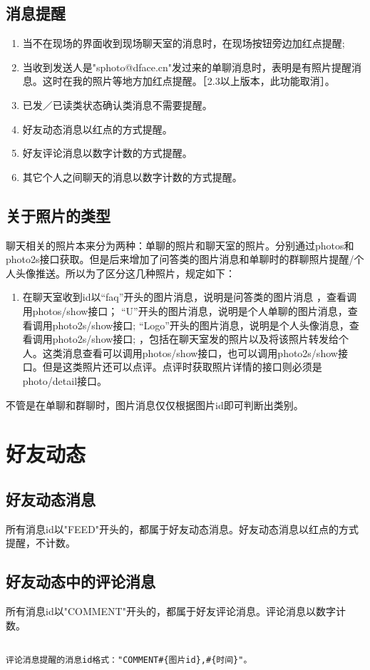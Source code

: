 \subsection{消息提醒}
\begin{enumerate}
\item 当不在现场的界面收到现场聊天室的消息时，在现场按钮旁边加红点提醒;
\item 当收到发送人是"sphoto@dface.cn"发过来的单聊消息时，表明是有照片提醒消息。这时在我的照片等地方加红点提醒。［2.3以上版本，此功能取消］。
\item 已发／已读类状态确认类消息不需要提醒。
\item 好友动态消息以红点的方式提醒。
\item 好友评论消息以数字计数的方式提醒。
\item 其它个人之间聊天的消息以数字计数的方式提醒。
\end{enumerate}


\subsection{关于照片的类型}
聊天相关的照片本来分为两种：单聊的照片和聊天室的照片。分别通过photos和photo2s接口获取。但是后来增加了问答类的图片消息和单聊时的群聊照片提醒/个人头像推送。所以为了区分这几种照片，规定如下：
\begin{enumerate}
\item 在聊天室收到id以“faq”开头的图片消息，说明是问答类的图片消息 ，查看调用photos/show接口；
“U”开头的图片消息，说明是个人单聊的图片消息，查看调用photo2s/show接口;
“Logo”开头的图片消息，说明是个人头像消息，查看调用photo2s/show接口;
，包括在聊天室发的照片以及将该照片转发给个人。这类消息查看可以调用photos/show接口，也可以调用photo2s/show接口。但是这类照片还可以点评。点评时获取照片详情的接口则必须是photo/detail接口。
\end{enumerate}

不管是在单聊和群聊时，图片消息仅仅根据图片id即可判断出类别。

\section{好友动态}
\subsection{好友动态消息}
所有消息id以"FEED"开头的，都属于好友动态消息。好友动态消息以红点的方式提醒，不计数。
\subsection{好友动态中的评论消息}
所有消息id以"COMMENT"开头的，都属于好友评论消息。评论消息以数字计数。
\begin{verbatim}

评论消息提醒的消息id格式："COMMENT#{图片id},#{时间}"。
\end{verbatim}

